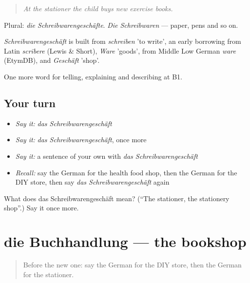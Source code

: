 \begin{quote}
\emph{At the stationer the child buys new exercise books.}
\end{quote}

Plural: \emph{die Schreibwarengeschäfte}. \emph{Die Schreibwaren} — paper, pens and so on.

\begin{cousinweb}
\emph{Schreibwarengeschäft} is built from \emph{schreiben} 'to write', an early borrowing from Latin \emph{scrībere} (Lewis \& Short), \emph{Ware} 'goods', from Middle Low German \emph{ware} (EtymDB), and \emph{Geschäft} 'shop'.
\end{cousinweb}

\begin{grammarlens}[title={What you've built}]
One more word for telling, explaining and describing at B1.
\end{grammarlens}

\subsection*{Your turn}
\begin{itemize}
\raggedright
  \item \emph{Say it:} \emph{das Schreibwarengeschäft}
  \item \emph{Say it:} \emph{das Schreibwarengeschäft}, once more
  \item \emph{Say it:} a sentence of your own with \emph{das Schreibwarengeschäft}
  \item \emph{Recall:} say the German for the health food shop, then the German for the DIY store, then say \emph{das Schreibwarengeschäft} again
\end{itemize}

\begin{tcolorbox}[breakable,colback=teal!4,colframe=teal!35!black,title={Before you move on}]
What does das Schreibwarengeschäft mean? (\textquotedblleft{}The stationer, the stationery shop\textquotedblright{}.) Say it once more.
\end{tcolorbox}
\section[die Buchhandlung]{die Buchhandlung — the bookshop}

\label{lesson:GE-C444-buchhandlung}



\begin{quote}
Before the new one: say the German for the DIY store, then the German for the stationer.
\end{quote}

